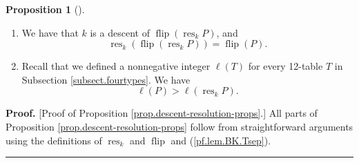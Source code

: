 \documentclass[numbers=enddot,12pt,final,onecolumn,notitlepage]{scrartcl}%
\theoremstyle{definition}
\newtheorem{prop}[theo]{Proposition}
\newenvironment{proposition}[1][]
{\begin{prop}[#1]\begin{leftbar}}
{\end{leftbar}\end{prop}}
\newenvironment{proof}[1][Proof]{\noindent\textbf{#1.} }{\ \rule{0.5em}{0.5em}}
\begin{document}
\begin{proposition}
\begin{enumerate}

\item \label{pf.lem.BK.res.flip}
We have that $k$ is a descent of $\operatorname*{flip}\left(  \operatorname*{res}%
\nolimits_{k}P\right)$, and
\[
\operatorname*{res}%
\nolimits_{k}\left(  \operatorname*{flip}\left(  \operatorname*{res}%
\nolimits_{k}P\right)  \right) = \operatorname*{flip}\left(  P\right).
\]

\item \label{pf.lem.BK.res.lendec}
Recall that we defined a nonnegative integer $\ell\left(
T\right)  $ for every 12-table $T$ in Subsection \ref{subsect.fourtypes}. We
have
\[
\ell\left(  P\right)  >\ell\left(  \operatorname*{res}\nolimits_{k}P\right)  .
\]

\end{enumerate}

\end{proposition}

\begin{proof}
[Proof of Proposition \ref{prop.descent-resolution-props}.]
All parts of Proposition \ref{prop.descent-resolution-props} follow from straightforward arguments
using the definitions of $\operatorname*{res}_{k}$ and $\operatorname*{flip}$
and (\ref{pf.lem.BK.Tsep}).
\end{proof}


\end{document}
